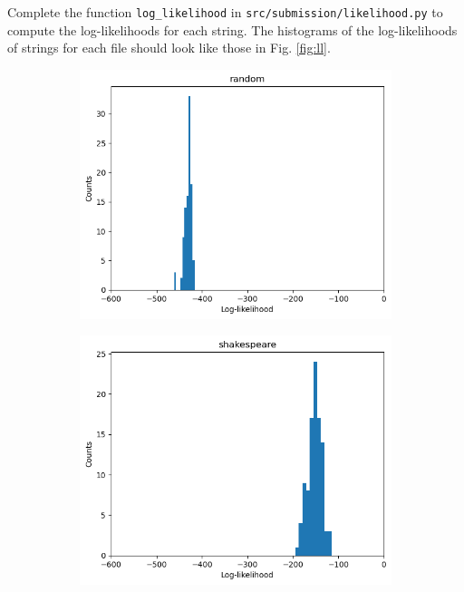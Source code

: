 \item {}

Complete the function \texttt{log\_likelihood} in \texttt{src/submission/likelihood.py} to compute the log-likelihoods for each string. 
The histograms of the log-likelihoods of strings for each file should look like those in Fig. \ref{fig:ll}.

\begin{figure}
    \centering
    \begin{subfigure}{0.3\textwidth}
        \includegraphics[width=\linewidth]{./figures/random}
    \end{subfigure}
    \begin{subfigure}{0.3\textwidth}
        \includegraphics[width=\linewidth]{./figures/shakespeare}

\end{subfigure}
\end{figure}

